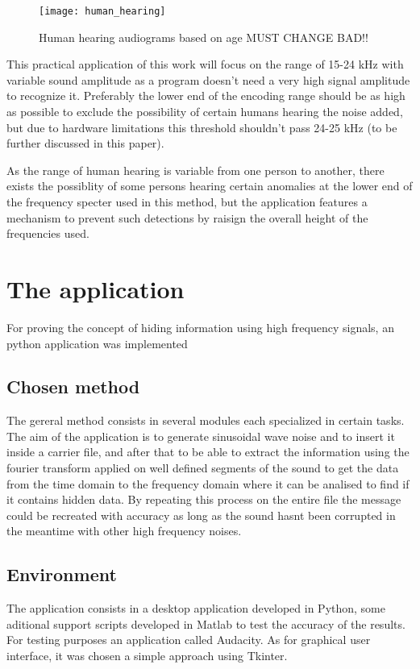 \documentclass[12pt]{report}
\begin{document}
\begin{figure}[h]
\centering
\texttt{[image: human\_hearing]}
\caption{Human hearing audiograms based on age\cite{note7} MUST CHANGE BAD!!}
\label{fig:human_hearing}
\end{figure}

This practical application of this work will focus on the range of 15-24 kHz with variable  sound amplitude as a program doesn't need a very high signal amplitude to recognize it. Preferably the lower end of the encoding range should be as high as possible to exclude the possibility of certain humans hearing the noise added, but due to hardware limitations this threshold shouldn't pass 24-25 kHz (to be further discussed in this paper).


As the range of human hearing is variable from one person to another, there exists the possiblity of some persons hearing certain anomalies at the lower end of the frequency specter used in this method, but the application features a mechanism to prevent such detections by raisign the overall height of the frequencies used.

\chapter{The application}
For proving the concept of hiding information using high frequency signals, an python application was implemented
\section{Chosen method}
The gereral method consists in several modules each specialized in certain tasks. The aim of the application is to generate sinusoidal wave noise and to insert it inside a carrier file, and after that to be able to extract the information using the fourier transform applied on well defined segments of the sound to get the data from the time domain to the frequency domain where it can be analised to find if it contains hidden data. By repeating this process on the entire file the message could be recreated with accuracy as long as the sound hasnt been corrupted in the meantime with other high frequency noises.
\section{Environment}
The application consists in a desktop application developed in Python, some aditional support scripts developed in Matlab to test the accuracy of the results. For testing purposes an application called Audacity. As for graphical user interface, it was chosen a simple approach using Tkinter.
\end{document}
